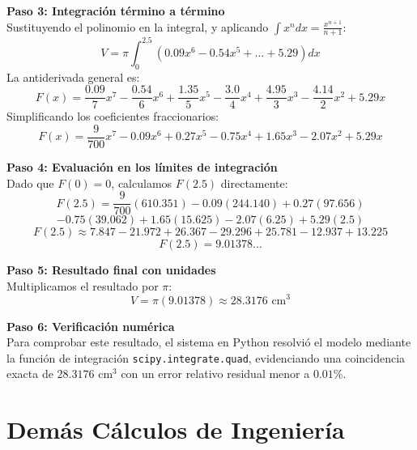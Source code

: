 \documentclass[conference, Spanish]{IEEEtran}
\begin{document}
\textbf{Paso 3: Integración término a término}\\
Sustituyendo el polinomio en la integral, y aplicando $\int x^n dx = \frac{x^{n+1}}{n+1}$:
\begin{equation*}
V = \pi \int_{0}^{2.5} (0.09x^6 - 0.54x^5 + \dots + 5.29) dx
\end{equation*}
La antiderivada general es:
\begin{equation*}
F(x) = \frac{0.09}{7}x^7 - \frac{0.54}{6}x^6 + \frac{1.35}{5}x^5 - \frac{3.0}{4}x^4 + \frac{4.95}{3}x^3 - \frac{4.14}{2}x^2 + 5.29x
\end{equation*}
Simplificando los coeficientes fraccionarios:
\begin{equation}
F(x) = \frac{9}{700}x^7 - 0.09x^6 + 0.27x^5 - 0.75x^4 + 1.65x^3 - 2.07x^2 + 5.29x
\end{equation}

\textbf{Paso 4: Evaluación en los límites de integración}\\
Dado que $F(0) = 0$, calculamos $F(2.5)$ directamente:
\begin{equation*}
F(2.5) = \frac{9}{700}(610.351) - 0.09(244.140) + 0.27(97.656) 
\end{equation*}
\begin{equation*}
- 0.75(39.062) + 1.65(15.625) - 2.07(6.25) + 5.29(2.5)
\end{equation*}
\begin{equation*}
F(2.5) \approx 7.847 - 21.972 + 26.367 - 29.296 + 25.781 - 12.937 + 13.225
\end{equation*}
\begin{equation*}
F(2.5) = 9.01378...
\end{equation*}

\textbf{Paso 5: Resultado final con unidades}\\
Multiplicamos el resultado por $\pi$:
\begin{equation}
V = \pi(9.01378) \approx 28.3176 \text{ cm}^3
\end{equation}

\textbf{Paso 6: Verificación numérica}\\
Para comprobar este resultado, el sistema en Python resolvió el modelo mediante la función de integración \texttt{scipy.integrate.quad}, evidenciando una coincidencia exacta de $28.3176$ cm$^3$ con un error relativo residual menor a $0.01\%$.

\section{Demás Cálculos de Ingeniería}
\end{document}
